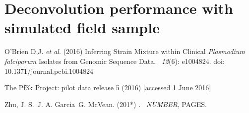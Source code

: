 \documentclass{article}
\begin{document}
\section{Deconvolution performance with simulated field sample}



%


\begin{thebibliography}{}
O'Brien D,J. {\em et al}. (2016)
\newblock Inferring Strain Mixture within Clinical {\em Plasmodium falciparum} Isolates from Genomic Sequence Data. ~{\em 12\/}(6): e1004824. doi: 10.1371/journal.pcbi.1004824


The Pf3k Project: pilot data release 5 (2016)
 [accessed 1 June 2016]


Zhu, J. S.\, J. A. Garcia\, G. McVean. (201*)
.
~{\em NUMBER\/}, PAGES.

\end{thebibliography}
\end{document}
